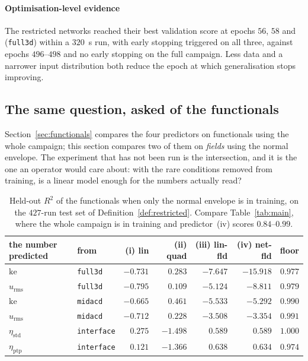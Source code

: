 \documentclass[11pt,a4paper]{article}
\theoremstyle{plain}
\theoremstyle{definition}
\theoremstyle{remark}
\begin{document}
\paragraph{Optimisation-level evidence}
The restricted networks reached their best validation score at epochs $56$,
$58$ and (\texttt{full3d}) within a $320$~s run, with early stopping triggered
on all three, against epochs $496$--$498$ and no early stopping on the full
campaign. Less data and a narrower input distribution both reduce the epoch at
which generalisation stops improving.

\subsection{The same question, asked of the functionals}
\label{sec:boundary-functionals}

Section~\ref{sec:functionals} compares the four predictors on functionals using
the whole campaign; this section compares two of them on \emph{fields} using the
normal envelope. The experiment that has not been run is the intersection, and
it is the one an operator would care about: with the rare conditions removed
from training, is a linear model enough for the numbers actually read?

\begin{table}[t]
\centering
\small
\begin{tabular}{@{}llrrrrr@{}}
\toprule
the number predicted & from & (i) lin & (ii) quad & (iii) lin-fld & (iv) net-fld & floor \\
\midrule
$\mathrm{ke}$              & \texttt{full3d}    & $-0.731$ & $\mathbf{0.283}$ & $-7.647$ & $-15.918$ & $0.977$ \\
$u_{\mathrm{rms}}$         & \texttt{full3d}    & $-0.795$ & $\mathbf{0.109}$ & $-5.124$ & $-8.811$  & $0.979$ \\
$\mathrm{ke}$              & \texttt{midacd}    & $-0.665$ & $\mathbf{0.461}$ & $-5.533$ & $-5.292$  & $0.990$ \\
$u_{\mathrm{rms}}$         & \texttt{midacd}    & $-0.712$ & $\mathbf{0.228}$ & $-3.508$ & $-3.354$  & $0.991$ \\
$\eta_{\mathrm{std}}$      & \texttt{interface} & $0.275$  & $-1.498$ & $\mathbf{0.589}$ & $\mathbf{0.589}$ & $1.000$ \\
$\eta_{\mathrm{ptp}}$      & \texttt{interface} & $0.121$  & $-1.366$ & $\mathbf{0.638}$ & $0.634$ & $0.974$ \\
\bottomrule
\end{tabular}
\caption{Held-out $R^2$ of the functionals when only the normal envelope is in
training, on the $427$-run test set of Definition~\ref{def:restricted}. Compare
Table~\ref{tab:main}, where the whole campaign is in training and predictor~(iv)
scores $0.84$--$0.99$.}
\label{tab:boundary-func}
\end{table}
\end{document}
